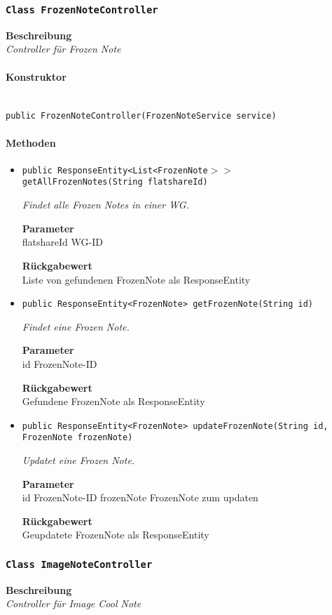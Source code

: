    \subsubsection{\texttt{Class FrozenNoteController}}
    \textbf{Beschreibung} \\
    \textit{Controller für Frozen Note}
    \paragraph*{Konstruktor}\mbox{} \\
    \texttt{public FrozenNoteController(FrozenNoteService service)} \\
    \paragraph*{Methoden}
    \begin{itemize}
    	\item{\texttt{public ResponseEntity<List<FrozenNote$>>$ getAllFrozenNotes(String flatshareId)}}
    	
    	\textit{Findet alle Frozen Notes in einer WG.}
    	
    	\textbf{Parameter} \\
    	flatshareId WG-ID
    	
    	\textbf{Rückgabewert} \\
    	Liste von gefundenen FrozenNote als ResponseEntity        \item{\texttt{public ResponseEntity<FrozenNote> getFrozenNote(String id)}}
    	
    	\textit{Findet eine Frozen Note.}
    	
    	\textbf{Parameter} \\
    	id FrozenNote-ID
    	
    	\textbf{Rückgabewert} \\
    	Gefundene FrozenNote als ResponseEntity        \item{\texttt{public ResponseEntity<FrozenNote> updateFrozenNote(String id, FrozenNote frozenNote)}}
    	
    	\textit{Updatet eine Frozen Note.}
    	
    	\textbf{Parameter} \\
    	id FrozenNote-ID
    	frozenNote FrozenNote zum updaten
    	
    	\textbf{Rückgabewert} \\
    	Geupdatete FrozenNote als ResponseEntity
    \end{itemize}
    \subsubsection{\texttt{Class ImageNoteController}}
    \textbf{Beschreibung} \\
    \textit{Controller für Image Cool Note}
